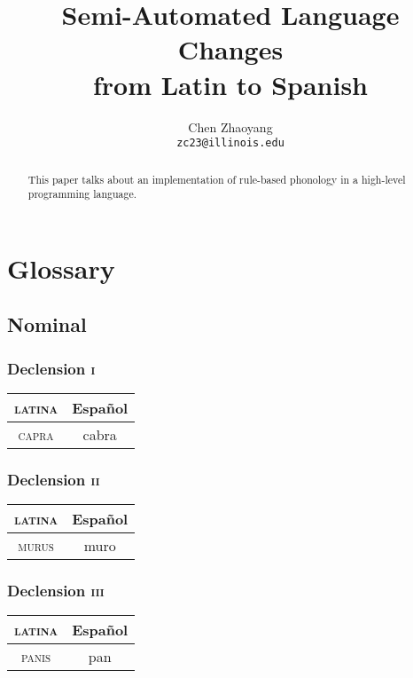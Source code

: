 \documentclass{report}
\title{Semi-Automated Language Changes \\ from Latin to Spanish}
\author{Chen Zhaoyang \\ \texttt{zc23@illinois.edu}}
\begin{document}
\maketitle

\pagebreak

\begin{abstract}

  This paper talks about an implementation of rule-based phonology in a high-level programming language.

\end{abstract}

\pagebreak

\tableofcontents

\pagebreak

\chapter{Glossary}

\section{Nominal}

\subsection{Declension \textsc{i}}

\begin{tabular}{|c|c|}
  \hline
  \textsc{latina} & Español \\
  \hline
  \textsc{capra} & cabra \\
  \hline
\end{tabular}

\subsection{Declension \textsc{ii}}

\begin{tabular}{|c|c|}
  \hline
  \textsc{latina} & Español \\
  \hline
  \textsc{murus} & muro \\
  \hline
\end{tabular}

\subsection{Declension \textsc{iii}}

\begin{tabular}{|c|c|}
  \hline
  \textsc{latina} & Español \\
  \hline
  \textsc{panis} & pan \\
  \hline
\end{tabular}
\end{document}
